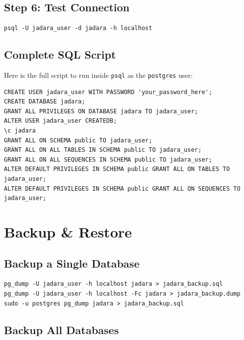 \documentclass[11pt,a4paper]{article}
\begin{document}
\subsection{Step 6: Test Connection}

\begin{lstlisting}[style=shell]
psql -U jadara_user -d jadara -h localhost
\end{lstlisting}

\subsection{Complete SQL Script}

Here is the full script to run inside \texttt{psql} as the \texttt{postgres} user:

\begin{lstlisting}[style=sql]
CREATE USER jadara_user WITH PASSWORD 'your_password_here';
CREATE DATABASE jadara;
GRANT ALL PRIVILEGES ON DATABASE jadara TO jadara_user;
ALTER USER jadara_user CREATEDB;
\c jadara
GRANT ALL ON SCHEMA public TO jadara_user;
GRANT ALL ON ALL TABLES IN SCHEMA public TO jadara_user;
GRANT ALL ON ALL SEQUENCES IN SCHEMA public TO jadara_user;
ALTER DEFAULT PRIVILEGES IN SCHEMA public GRANT ALL ON TABLES TO jadara_user;
ALTER DEFAULT PRIVILEGES IN SCHEMA public GRANT ALL ON SEQUENCES TO jadara_user;
\end{lstlisting}

\section{Backup \& Restore}

\subsection{Backup a Single Database}

\begin{lstlisting}[style=shell]
pg_dump -U jadara_user -h localhost jadara > jadara_backup.sql
pg_dump -U jadara_user -h localhost -Fc jadara > jadara_backup.dump
sudo -u postgres pg_dump jadara > jadara_backup.sql
\end{lstlisting}

\subsection{Backup All Databases}
\end{document}
